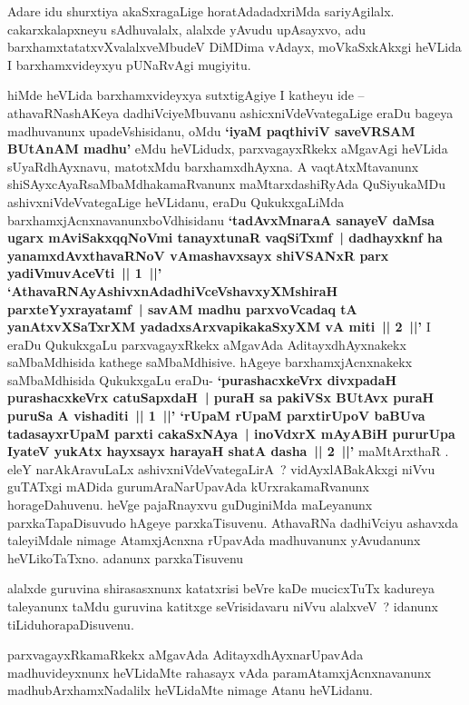 \begin{artha}
Adare idu shurxtiya akaSxragaLige horatAdadadxriMda sariyAgilalx. cakarxkalapxneyu  sAdhuvalalx, alalxde yAvudu upAsayxvo, adu barxhamxtatatxvXvalalxveMbudeV DiMDima	vAdayx, moVkaSxkAkxgi heVLida I barxhamxvideyxyu pUNaRvAgi mugiyitu.
\end{artha}

\begin{artha}
hiMde heVLida barxhamxvideyxya sutxtigAgiye I katheyu ide -- athavaRNashAKeya dadhiVciyeMbuvanu ashicxniVdeVvategaLige eraDu bageya madhuvanunx upadeVshisidanu, oMdu \textbf{`iyaM paqthiviV saveVRSAM BUtAnAM madhu'} eMdu heVLidudx, parxvagayxRkekx aMgavAgi heVLida sUyaRdhAyxnavu, matotxMdu barxhamxdhAyxna. A vaqtAtxMtavanunx shiSAyxcAyaRsaMbaMdhakamaRvanunx maMtarxdashiRyAda QuSiyukaMDu  ashivxniVdeVvategaLige heVLidanu, eraDu QukukxgaLiMda barxhamxjAcnxnavanunx\break boVdhisidanu \textbf{`tadAvxMnaraA sanayeV daMsa ugarx mAviSakxqqNoVmi tanayxtunaR vaqSiTxmf~| dadhayxknf ha yanamxdAvxthavaRNoV vAmashavxsayx shiVSANxR parx yadiVmuvAceVti~|| 1~||' `AthavaRNAyAshivxnAdadhiVceVshavxyXMshiraH parxteYyxrayatamf~| savAM madhu parxvoVcadaq tA  yanAtxvXSaTxrXM yadadxsArxvapikakaSxyXM vA miti~|| 2~||'} I eraDu QukukxgaLu parxvagayxRkekx aMgavAda AditayxdhAyxnakekx saMbaMdhisida kathege saMbaMdhisive. hAgeye barxhamxjAcnxnakekx saMbaMdhisida QukukxgaLu eraDu- \textbf{`purashacxkeVrx divxpadaH purashacxkeVrx catuSapxdaH~| puraH sa pakiVSx BUtAvx puraH puruSa A vishaditi~|| 1~||' `rUpaM rUpaM parxtirUpoV baBUva tadasayxrUpaM parxti cakaSxNAya~| inoVdxrX mAyABiH pururUpa IyateV yukAtx hayxsayx harayaH shatA dasha~|| 2~||'}  maMtArxthaR . eleY narAkAravuLaLx ashivxniVdeVvategaLirA~? vidAyxlABakAkxgi niVvu guTATxgi mADida gurumAraNarUpavAda kUrxrakamaRvanunx horageDahuvenu. heVge pajaRnayxvu guDuginiMda maLeyanunx parxkaTapaDisuvudo hAgeye parxkaTisuvenu. AthavaRNa dadhiVciyu ashavxda taleyiMdale nimage AtamxjAcnxna rUpavAda madhuvanunx yAvudanunx heVLikoTaTxno. adanunx parxkaTisuvenu
\end{artha}

\begin{artha}
alalxde guruvina shirasasxnunx katatxrisi beVre kaDe mucicxTuTx kadureya taleyanunx taMdu guruvina katitxge seVrisidavaru niVvu alalxveV~? idanunx tiLidu\break horapaDisuvenu.
\end{artha}

\begin{artha}
parxvagayxRkamaRkekx aMgavAda AditayxdhAyxnarUpavAda madhuvideyxnunx heVLidaMte rahasayx vAda paramAtamxjAcnxnavanunx madhubArxhamxNadalilx heVLidaMte nimage Atanu heVLidanu.
\end{artha}

